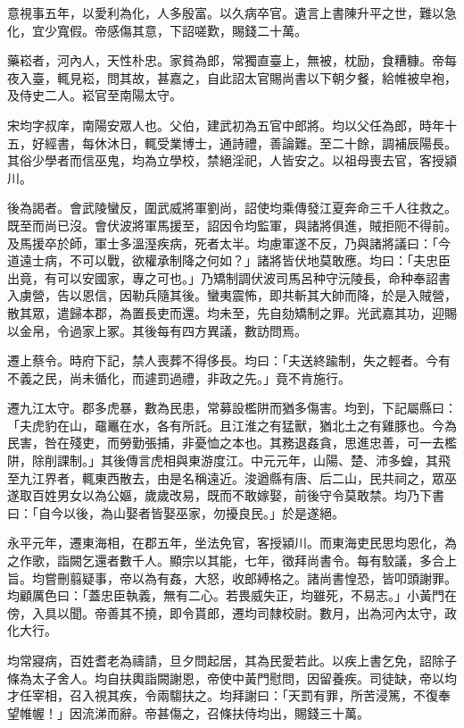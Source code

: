 \begin{pinyinscope}
意視事五年，以愛利為化，人多殷富。以久病卒官。遺言上書陳升平之世，難以急化，宜少寬假。帝感傷其意，下詔嗟歎，賜錢二十萬。

藥崧者，河內人，天性朴忠。家貧為郎，常獨直臺上，無被，枕励，食糟糠。帝每夜入臺，輒見崧，問其故，甚嘉之，自此詔太官賜尚書以下朝夕餐，給帷被皁袍，及侍史二人。崧官至南陽太守。

宋均字叔庠，南陽安眾人也。父伯，建武初為五官中郎將。均以父任為郎，時年十五，好經書，每休沐日，輒受業博士，通詩禮，善論難。至二十餘，調補辰陽長。其俗少學者而信巫鬼，均為立學校，禁絕淫祀，人皆安之。以祖母喪去官，客授潁川。

後為謁者。會武陵蠻反，圍武威將軍劉尚，詔使均乘傳發江夏奔命三千人往救之。既至而尚已沒。會伏波將軍馬援至，詔因令均監軍，與諸將俱進，賊拒阨不得前。及馬援卒於師，軍士多溫溼疾病，死者太半。均慮軍遂不反，乃與諸將議曰：「今道遠士病，不可以戰，欲權承制降之何如？」諸將皆伏地莫敢應。均曰：「夫忠臣出竟，有可以安國家，專之可也。」乃矯制調伏波司馬呂种守沅陵長，命种奉詔書入虜營，告以恩信，因勒兵隨其後。蠻夷震怖，即共斬其大帥而降，於是入賊營，散其眾，遣歸本郡，為置長吏而還。均未至，先自劾矯制之罪。光武嘉其功，迎賜以金帛，令過家上冢。其後每有四方異議，數訪問焉。

遷上蔡令。時府下記，禁人喪葬不得侈長。均曰：「夫送終踰制，失之輕者。今有不義之民，尚未循化，而遽罰過禮，非政之先。」竟不肯施行。

遷九江太守。郡多虎暴，數為民患，常募設檻阱而猶多傷害。均到，下記屬縣曰：「夫虎豹在山，黿鼉在水，各有所託。且江淮之有猛獸，猶北土之有雞豚也。今為民害，咎在殘吏，而勞勤張捕，非憂恤之本也。其務退姦貪，思進忠善，可一去檻阱，除削課制。」其後傳言虎相與東游度江。中元元年，山陽、楚、沛多蝗，其飛至九江界者，輒東西散去，由是名稱遠近。浚遒縣有唐、后二山，民共祠之，眾巫遂取百姓男女以為公嫗，歲歲改易，既而不敢嫁娶，前後守令莫敢禁。均乃下書曰：「自今以後，為山娶者皆娶巫家，勿擾良民。」於是遂絕。

永平元年，遷東海相，在郡五年，坐法免官，客授潁川。而東海吏民思均恩化，為之作歌，詣闕乞還者數千人。顯宗以其能，七年，徵拜尚書令。每有駮議，多合上旨。均嘗刪翦疑事，帝以為有姦，大怒，收郎縛格之。諸尚書惶恐，皆叩頭謝罪。均顧厲色曰：「蓋忠臣執義，無有二心。若畏威失正，均雖死，不易志。」小黃門在傍，入具以聞。帝善其不撓，即令貰郎，遷均司隸校尉。數月，出為河內太守，政化大行。

均常寢病，百姓耆老為禱請，旦夕問起居，其為民愛若此。以疾上書乞免，詔除子條為太子舍人。均自扶輿詣闕謝恩，帝使中黃門慰問，因留養疾。司徒缺，帝以均才任宰相，召入視其疾，令兩騶扶之。均拜謝曰：「天罰有罪，所苦浸篤，不復奉望帷幄！」因流涕而辭。帝甚傷之，召條扶侍均出，賜錢三十萬。


\end{pinyinscope}
